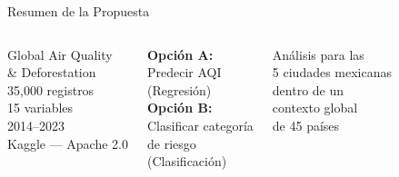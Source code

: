 \documentclass[aspectratio=169]{beamer}
\begin{document}
\begin{frame}{Resumen de la Propuesta}
\vspace{0.2cm}
\begin{columns}[T]
\begin{tcolorbox}[colback=uaemcolor!6, colframe=uaemcolor!60, title=\textbf{Dataset}]
\small\centering
Global Air Quality\\
\& Deforestation\\[4pt]
35{,}000 registros\\
15 variables\\
2014--2023\\[4pt]
\footnotesize Kaggle — Apache 2.0
\end{tcolorbox}

\begin{tcolorbox}[colback=verdeenv!6, colframe=verdeenv!60, title=\textbf{Objetivos}]
\small\centering
\textbf{Opción A:}\\Predecir AQI\\(Regresión)\\[6pt]
\textbf{Opción B:}\\Clasificar categoría\\de riesgo\\(Clasificación)
\end{tcolorbox}

\begin{tcolorbox}[colback=naranjaaqi!6, colframe=naranjaaqi!60, title=\textbf{Valor agregado}]
\small\centering
Análisis para las\\5 ciudades mexicanas\\dentro de un\\contexto global\\de 45 países
\end{tcolorbox}
\end{columns}

\end{frame}
\end{document}
